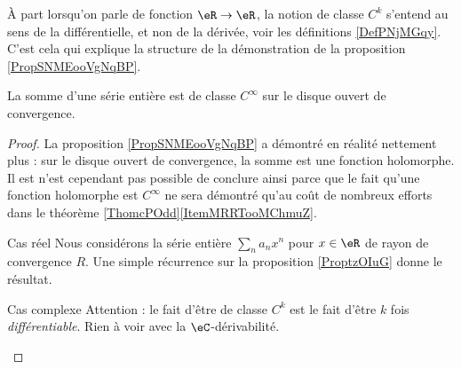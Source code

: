 \begin{remark}
    À part lorsqu'on parle de fonction \( \eR\to \eR\), la notion de classe \( C^k\) s'entend au sens de la différentielle, et non de la dérivée, voir les définitions \ref{DefPNjMGqy}. C'est cela qui explique la structure de la démonstration de la proposition \ref{PropSNMEooVgNqBP}.
\end{remark}

\begin{corollary}       \label{CorCBYHooQhgara}
    La somme d'une série entière est de classe \( C^{\infty}\) sur le disque ouvert de convergence.
\end{corollary}

\begin{proof}
    La proposition \ref{PropSNMEooVgNqBP} a démontré en réalité nettement plus : sur le disque ouvert de convergence, la somme est une fonction holomorphe. Il est n'est cependant pas possible de conclure ainsi parce que le fait qu'une fonction holomorphe est \( C^{\infty}\) ne sera démontré qu'au coût de nombreux efforts dans le théorème \ref{ThomcPOdd}\ref{ItemMRRTooMChmuZ}.

    \begin{subproof}
    \item[Cas réel]
        Nous considérons la série entière \( \sum_na_nx^n\) pour \( x\in \eR\) de rayon de convergence \( R\). Une simple récurrence sur la proposition \ref{ProptzOIuG} donne le résultat.
    \item[Cas complexe]
        Attention : le fait d'être de classe \( C^k\) est le fait d'être \( k\) fois \emph{différentiable}. Rien à voir avec la \( \eC\)-dérivabilité.


\end{subproof}
\end{proof}
